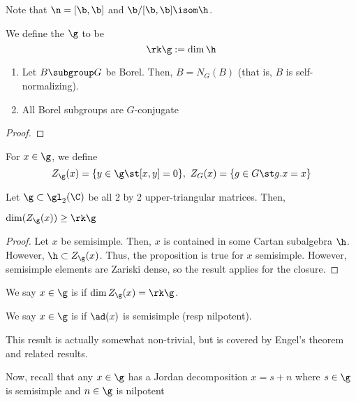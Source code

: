  \begin{rmk}
   Note that \(\n = [\b,\b]\) and \(\b/[\b,\b] \isom \h\). 
 \end{rmk}
 \begin{defn}
   We define the  \(\g\) to be \[
     \rk \g := \dim \h
   \]
 \end{defn}
 \begin{lem}
   \begin{enumerate}
   \item    Let \(B \subgroup G\) be Borel. Then, \(B = N_G(B)\) (that is,
   \(B\) is self-normalizing).
   \item All Borel subgroups are \(G\)-conjugate
   \end{enumerate}
 \end{lem}
 \begin{proof}
 \end{proof}
 \begin{defn}
   For \(x \in \g\), we define \[
     Z_\g(x) = \{y \in \g \st [x,y] = 0\}, \ Z_G(x) = \{g \in G \st
     g.x = x\}
   \]
 \end{defn}
 \begin{example}
   Let \(\g \subset \gl_2(\C)\) be all 2 by 2 upper-triangular
   matrices. Then,
 \end{example}
 \begin{prop}
   \(\dim(Z_\g(x)) \geq \rk \g\)
 \end{prop}
 \begin{proof}
   Let \(x\) be semisimple. Then, \(x\) is contained in some Cartan
   subalgebra \(\h\). However, \(\h \subset Z_\g(x)\). Thus, the
   proposition is true for \(x\) semisimple. However, semisimple
   elements are Zariski dense, so the result applies for the closure. 
 \end{proof}
 \begin{defn}
   We say \(x \in \g\) is  if \(\dim Z_\g(x) = \rk \g\). 
 \end{defn}
 \begin{defn}
   We say \(x \in \g\) is  if
   \(\ad(x)\) is semisimple (resp nilpotent). 
 \end{defn}
 \begin{rmk}
   This result is actually somewhat non-trivial, but is covered by
   Engel's theorem and related results.
 \end{rmk}
 Now, recall that any \(x \in \g\) has a Jordan decomposition \(x = s
 + n\) where \(s \in \g\) is semisimple and \(n \in \g\) is nilpotent
